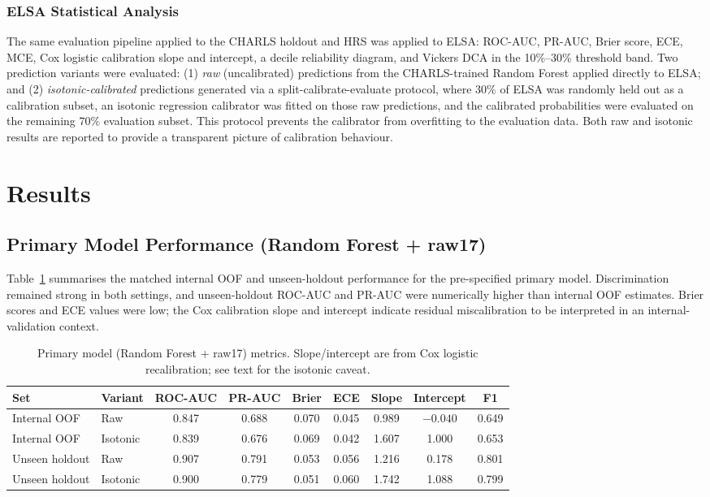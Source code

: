 \documentclass[11pt,a4paper]{article}
\begin{document}
\subsubsection*{ELSA Statistical Analysis}
The same evaluation pipeline applied to the CHARLS holdout and HRS was applied to ELSA:
ROC-AUC, PR-AUC, Brier score, ECE, MCE, Cox logistic calibration slope and intercept, a decile
reliability diagram, and Vickers DCA in the 10\%--30\% threshold band. Two prediction variants
were evaluated: (1) \emph{raw} (uncalibrated) predictions from the CHARLS-trained Random Forest
applied directly to ELSA; and (2) \emph{isotonic-calibrated} predictions generated via a
split-calibrate-evaluate protocol, where $30\%$ of ELSA was randomly held out as a calibration
subset, an isotonic regression calibrator was fitted on those raw predictions, and the
calibrated probabilities were evaluated on the remaining $70\%$ evaluation subset. This
protocol prevents the calibrator from overfitting to the evaluation data. Both raw and isotonic
results are reported to provide a transparent picture of calibration behaviour.

\section{Results}

\subsection{Primary Model Performance (Random Forest + raw17)}
Table~\ref{tab:primary-metrics} summarises the matched internal OOF and unseen-holdout performance
for the pre-specified primary model. Discrimination remained strong in both settings, and
unseen-holdout ROC-AUC and PR-AUC were numerically higher than internal OOF estimates. Brier scores
and ECE values were low; the Cox calibration slope and intercept indicate residual miscalibration to
be interpreted in an internal-validation context.

\begin{table}[h!]
\centering
\small
\caption{Primary model (Random Forest + raw17) metrics. Slope/intercept are from Cox logistic
recalibration; see text for the isotonic caveat.}
\label{tab:primary-metrics}
\begin{tabular}{llccccccc}
\toprule
Set & Variant & ROC-AUC & PR-AUC & Brier & ECE & Slope & Intercept & F1 \\
\midrule
Internal OOF & Raw & 0.847 & 0.688 & 0.070 & 0.045 & 0.989 & $-0.040$ & 0.649 \\
Internal OOF & Isotonic & 0.839 & 0.676 & 0.069 & 0.042 & 1.607 & 1.000 & 0.653 \\
Unseen holdout & Raw & 0.907 & 0.791 & 0.053 & 0.056 & 1.216 & 0.178 & 0.801 \\
Unseen holdout & Isotonic & 0.900 & 0.779 & 0.051 & 0.060 & 1.742 & 1.088 & 0.799 \\
\bottomrule
\end{tabular}
\end{table}
\end{document}
